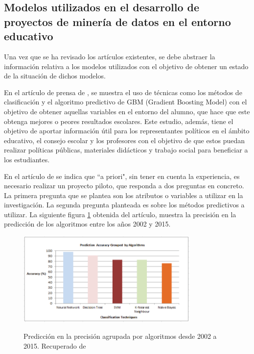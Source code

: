 \subsection{Modelos utilizados en el desarrollo de proyectos de minería de datos en el entorno educativo}
Una vez que se ha revisado los artículos existentes, se debe abstraer la información relativa a los modelos utilizados con el objetivo de obtener un estado de la situación de dichos modelos.

En el artículo de prensa de , se muestra el uso de técnicas como los métodos de clasificación y el algoritmo predictivo de GBM (Gradient Boosting Model) con el objetivo de obtener aquellas variables en el entorno del alumno, que hace que este obtenga mejores o peores resultados escolares. Este estudio, además, tiene el objetivo de aportar información útil para los representantes políticos en el ámbito educativo, el consejo escolar y los profesores con el objetivo de que estos puedan realizar políticas públicas, materiales didácticos y trabajo social para beneficiar a los estudiantes.

En el artículo de  se indica que ``a priori", sin tener en cuenta la experiencia, es necesario realizar un proyecto piloto, que responda a dos preguntas en concreto. La primera pregunta que se plantea son los atributos o variables a utilizar en la investigación. La segunda pregunta planteada es sobre los métodos predictivos a utilizar. La siguiente figura \ref{fig:precMet} obtenida del artículo, muestra la precisión en la predicción de los algoritmos entre los años 2002 y 2015.

\begin{figure}[htb]
	\centering
	\caption{Predicción en la precisión agrupada por algoritmos desde 2002 a 2015. Recuperado de \protect{}}
	\includegraphics[width=0.8\textwidth]{recursos/PrecisionMetodos}
	\label{fig:precMet}
\end{figure}

